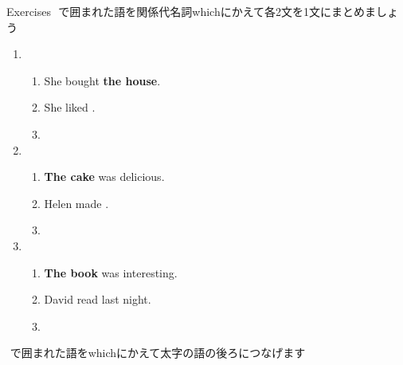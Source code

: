 \documentclass[aspectratio=169,xcolor={dvipsnames,table}]{beamer}
\begin{document}
\begin{frame}[plain]{Exercises}
\fbox{　　}\,\,で囲まれた語を関係代名詞whichにかえて各2文を1文にまとめましょう
\begin{enumerate}
 \item \begin{enumerate}
	\item She bought {\bfseries the house}.
	\item She liked .
	\item {}
       \end{enumerate} \item \begin{enumerate}
	\item {\bfseries The cake} was delicious.
	\item Helen made .
	\item {}
       \end{enumerate}

 \item \begin{enumerate}
	\item {\bfseries The book} was interesting.
	\item David read  last night.
	\item {}
       \end{enumerate}
\end{enumerate} 

\hfill\fbox{　　}\,\,で囲まれた語をwhichにかえて太字の語の後ろにつなげます
\end{frame}
\end{document}
